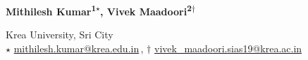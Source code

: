 \documentclass{SciPost}
\begin{document}
\pagestyle{SPstyle}

\begin{center}{\Large \textbf{\color{scipostdeepblue}{
Quantum State Visualization in Qiskit\\
}}}\end{center}

\begin{center}\textbf{
Mithilesh Kumar\textsuperscript{1$\star$},
Vivek Maadoori\textsuperscript{2$\dagger$}
}\end{center}

\begin{center}
Krea University, Sri City
%
\\[\baselineskip]
$\star$ \href{mailto:email1}{\small mithilesh.kumar@krea.edu.in}\,,\quad
$\dagger$ \href{mailto:email2}{\small vivek\_maadoori.sias19@krea.ac.in}

\end{center}


\section*{\color{scipostdeepblue}{Abstract}}
\textbf{}

\vspace{\baselineskip}
\end{document}
